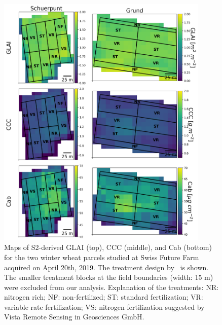 \begin{figure}[H]
    \centering
    \includegraphics[width=0.9\textwidth]{05-Insights/img/SFF_2019_treatments_map.png}
    \caption[Maps of S2-derived GLAI (top), CCC (middle), and Cab (bottom) for the two winter wheat parcels studied at Swiss Future Farm acquired on April 20th, 2019. The treatment design by~\cite{argento_investigating_2022} is shown. The smaller treatment blocks at the field boundaries (width: 15 m) were excluded from our analysis. Explanation of the treatments: NR: nitrogen rich; NF: non-fertilized; ST: standard fertilization; VR: variable rate fertilization; VS: nitrogen fertilization suggested by Vista Remote Sensing in Geosciences GmbH.]{Maps of S2-derived GLAI (top), CCC (middle), and Cab (bottom) for the two winter wheat parcels studied at Swiss Future Farm acquired on April 20th, 2019. The treatment design by~\cite{argento_investigating_2022} is shown. The smaller treatment blocks at the field boundaries (width: 15 m) were excluded from our analysis. Explanation of the treatments: NR: nitrogen rich; NF: non-fertilized; ST: standard fertilization; VR: variable rate fertilization; VS: nitrogen fertilization suggested by Vista Remote Sensing in Geosciences GmbH.}
    \label{fig:appendix_sff_2019}
\end{figure}

